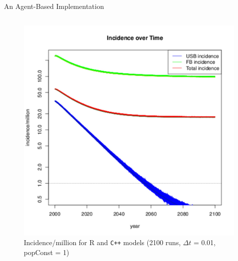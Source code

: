 \documentclass[final]{beamer}
\begin{document}
\begin{frame}
\begin{columns}[T]
\begin{column}{.3\textwidth}
\begin{block}{An Agent-Based Implementation}
\begin{columns}[T]
\begin{column}{.45\textwidth}
\begin{figure}[h]
\begin{center}
                \includegraphics[height=0.8\textwidth,width=\textwidth]{finalRunSmall2}
              \end{center}
              \caption{Incidence/million for R and \texttt{C++} models (2100 runs, $\Delta t$ = 0.01, popConst = 1)}
              \label{fig:finalRun}
            \end{figure}
          \end{column}
        \end{columns}
      \end{block}
      

\end{column}
\end{columns}
\end{frame}
\end{document}

